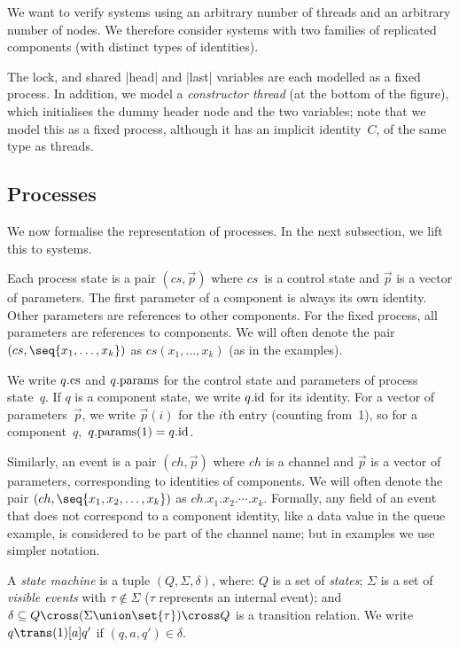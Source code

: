 We want to verify systems using an arbitrary number of threads and an
arbitrary number of nodes.  We therefore consider systems with two families of
replicated components (with distinct types of identities). 

The lock, and shared |head| and |last| variables are each modelled as a fixed
process.  In addition, we model a \emph{constructor thread} (at the bottom of
the figure), which initialises the dummy header node and the two variables;
note that we model this as a fixed process, although it has an implicit
identity~$C$, of the same type as threads.



\subsection{Processes}

We now formalise the representation of processes.  In the next subsection, we
lift this to systems.

Each process state is a pair $(cs, \vec p)$ where $cs$~is a control state and
$\vec p$ is a vector of parameters.  The first parameter of a component is
always its own identity.  Other parameters are references to other components.
For the fixed process, all parameters are references to components.  We will
often denote the pair $(cs, \seq{x_1,\ldots,x_k})$ as $cs(x_1,\ldots,x_k)$ (as
in the examples).

We write $q.\mathrm{cs}$ and $q.\mathrm{params}$ for the control state and parameters of
process state~$q$.  If $q$ is a component state, we write $q.\mathrm{id}$ for its
identity.  For a vector of parameters~$\vec p$, we write $\vec p(i)$ for the
$i$th entry (counting from~1), so for a component~$q$,\, $q.\mathrm{params}(1) =
q.\mathrm{id}$.

Similarly, an event is a pair $(ch, \vec p)$ where $ch$ is a channel and
$\vec{p}$ is a vector of parameters, corresponding to identities of
components.  We will often denote the pair $(ch, \seq{x_1,x_2,\ldots,x_k})$ as
$ch.x_1.x_2.\cdots.x_k$.  Formally, any field of an event that does not
correspond to a component identity, like a data value in the queue example, is
considered to be part of the channel name; but in examples we use simpler
notation.

\begin{definition}
\label{def:state-machine}
A \emph{state machine} is a tuple $(Q, \Sigma, \delta)$, where: $Q$ is a set
of \emph{states}; $\Sigma$ is a set of \emph{visible events} with
$\tau \nin \Sigma$ ($\tau$ represents an internal event);
and
\( \delta \subseteq Q \cross (\Sigma \union \set{\tau}) \cross Q \) is a
transition relation.
We write $q \trans(1)[a] q'$ if $(q,a,q') \in \delta$.
\end{definition}


